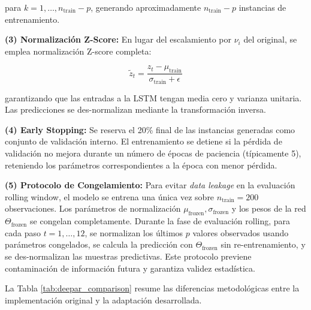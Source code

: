 para $k = 1, \ldots, n_{\text{train}} - p$, generando aproximadamente $n_{\text{train}} - p$ instancias de entrenamiento.

\textbf{(3) Normalización Z-Score:} En lugar del escalamiento por $\nu_i$ del original, se emplea normalización Z-score completa:

\begin{equation}
\tilde{z}_t = \frac{z_t - \mu_{\text{train}}}{\sigma_{\text{train}} + \epsilon}
\end{equation}

garantizando que las entradas a la LSTM tengan media cero y varianza unitaria. Las predicciones se des-normalizan mediante la transformación inversa.

\textbf{(4) Early Stopping:} Se reserva el 20\% final de las instancias generadas como conjunto de validación interno. El entrenamiento se detiene si la pérdida de validación no mejora durante un número de épocas de paciencia (típicamente 5), reteniendo los parámetros correspondientes a la época con menor pérdida.

\textbf{(5) Protocolo de Congelamiento:} Para evitar \textit{data leakage} en la evaluación rolling window, el modelo se entrena una única vez sobre $n_{\text{train}} = 200$ observaciones. Los parámetros de normalización $\mu_{\text{frozen}}, \sigma_{\text{frozen}}$ y los pesos de la red $\Theta_{\text{frozen}}$ se congelan completamente. Durante la fase de evaluación rolling, para cada paso $t = 1, \ldots, 12$, se normalizan los últimos $p$ valores observados usando parámetros congelados, se calcula la predicción con $\Theta_{\text{frozen}}$ sin re-entrenamiento, y se des-normalizan las muestras predictivas. Este protocolo previene contaminación de información futura y garantiza validez estadística.

La Tabla \ref{tab:deepar_comparison} resume las diferencias metodológicas entre la implementación original y la adaptación desarrollada.

